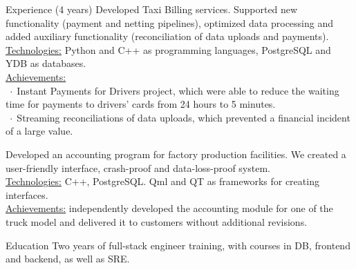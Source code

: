 \documentclass[12pt]{cutecv}
\newcommand{\listbullet}{$\; \cdot \;$}
\begin{document}
\begin{paracol}{2}
\begin{rightcolumn}
\begin{cvsection}{Experience (4 years)}
  {Developed Taxi Billing services. Supported new functionality (payment and netting pipelines), 
  optimized data processing and added auxiliary functionality (reconciliation of data uploads and payments). \\
  \underline{Technologies:} Python and C++ as programming languages, PostgreSQL and YDB as databases.\\
  \underline{Achievements:} \\ \listbullet Instant Payments for Drivers project, which
  were able to reduce the waiting time for payments to drivers' cards from 24 hours to 5 minutes.\\
  \listbullet Streaming reconciliations of data uploads, which prevented a financial incident of a large value.}
  
  {Developed an accounting program for factory production facilities. We created a user-friendly interface, crash-proof and data-loss-proof system. \\
  \underline{Technologies:} C++, PostgreSQL. Qml and QT as frameworks for creating interfaces.\\
  \underline{Achievements:} independently developed the accounting module for one of the truck model and delivered it to customers without additional revisions.}
\end{cvsection}
\begin{cvsection}{Education}
    {Two years of full-stack engineer training, with courses in DB, frontend and backend, as well as SRE.}
\end{cvsection}
\end{rightcolumn}
\end{paracol}
\end{document}
